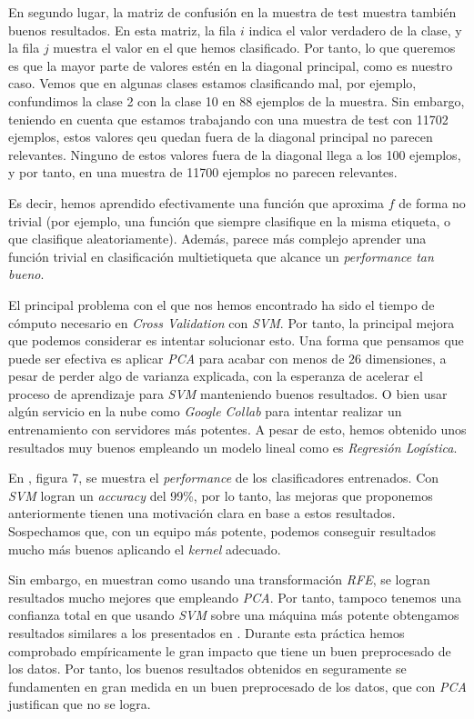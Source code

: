 \documentclass[11pt]{article}
\begin{document}
En segundo lugar, la matriz de confusión en la muestra de test muestra también buenos resultados. En esta matriz, la fila $i$ indica el valor verdadero de la clase, y la fila $j$ muestra el valor en el que hemos clasificado. Por tanto, lo que queremos es que la mayor parte de valores estén en la diagonal principal, como es nuestro caso. Vemos que en algunas clases estamos clasificando mal, por ejemplo, confundimos la clase 2 con la clase 10 en 88 ejemplos de la muestra. Sin embargo, teniendo en cuenta que estamos trabajando con una muestra de test con 11702 ejemplos, estos valores qeu quedan fuera de la diagonal principal no parecen relevantes. Ninguno de estos valores fuera de la diagonal llega a los 100 ejemplos, y por tanto, en una muestra de 11700 ejemplos no parecen relevantes.

Es decir, hemos aprendido efectivamente una función que aproxima $f$ de forma no trivial (por ejemplo, una función que siempre clasifique en la misma etiqueta, o que clasifique aleatoriamente). Además, parece más complejo aprender una función trivial en clasificación multietiqueta que alcance un \emph{performance tan bueno}.

El principal problema con el que nos hemos encontrado ha sido el tiempo de cómputo necesario en \emph{Cross Validation} con \emph{SVM}. Por tanto, la principal mejora que podemos considerar es intentar solucionar esto. Una forma que pensamos que puede ser efectiva es aplicar \emph{PCA} para acabar con menos de 26 dimensiones, a pesar de perder algo de varianza explicada, con la esperanza de acelerar el proceso de aprendizaje para \emph{SVM} manteniendo buenos resultados. O bien usar algún servicio en la nube como \emph{Google Collab} para intentar realizar un entrenamiento con servidores más potentes. A pesar de esto, hemos obtenido unos resultados muy buenos empleando un modelo lineal como es \emph{Regresión Logística}.

En \cite{paper_clasificacion_1:paper}, figura 7, se muestra el \emph{performance} de los clasificadores entrenados. Con \emph{SVM} logran un \emph{accuracy} del 99\%, por lo tanto, las mejoras que proponemos anteriormente tienen una motivación clara en base a estos resultados. Sospechamos que, con un equipo más potente, podemos conseguir resultados mucho más buenos aplicando el \emph{kernel} adecuado.

Sin embargo, en \cite{paper_clasificacion_1:paper} muestran como usando una transformación \emph{RFE}, se logran resultados mucho mejores que empleando \emph{PCA}. Por tanto, tampoco tenemos una confianza total en que usando \emph{SVM} sobre una máquina más potente obtengamos resultados similares a los presentados en \cite{paper_clasificacion_1:paper}. Durante esta práctica hemos comprobado empíricamente le gran impacto que tiene un buen preprocesado de los datos. Por tanto, los buenos resultados obtenidos en \cite{paper_clasificacion_1:paper} seguramente se fundamenten en gran medida en un buen preprocesado de los datos, que con \emph{PCA} justifican que no se logra.
\end{document}
